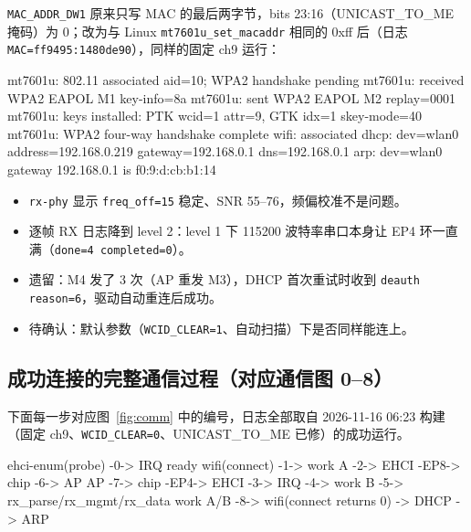 \documentclass[UTF8,zihao=-4,fontset=none]{ctexart}
\newcommand{\fn}[1]{\texttt{#1}}
\begin{document}
\fn{MAC\_ADDR\_DW1} 原来只写 MAC 的最后两字节，bits 23:16（UNICAST\_TO\_ME 掩码）为 0；改为与 Linux
\fn{mt7601u\_set\_macaddr} 相同的 0xff 后（日志 \fn{MAC=ff9495:1480de90}），同样的固定 ch9 运行：

\begin{logv}
mt7601u: 802.11 associated aid=10; WPA2 handshake pending
mt7601u: received WPA2 EAPOL M1 key-info=8a
mt7601u: sent WPA2 EAPOL M2 replay=0001
mt7601u: keys installed: PTK wcid=1 attr=9, GTK idx=1 skey-mode=40
mt7601u: WPA2 four-way handshake complete
wifi: associated
dhcp: dev=wlan0 address=192.168.0.219 gateway=192.168.0.1 dns=192.168.0.1
arp: dev=wlan0 gateway 192.168.0.1 is f0:9:d:cb:b1:14
\end{logv}

\begin{itemize}[leftmargin=2em]
\item \fn{rx-phy} 显示 \fn{freq\_off=15} 稳定、SNR 55--76，频偏校准不是问题。
\item 逐帧 RX 日志降到 level 2：level 1 下 115200 波特率串口本身让 EP4 环一直满（\fn{done=4 completed=0}）。
\item 遗留：M4 发了 3 次（AP 重发 M3），DHCP 首次重试时收到 \fn{deauth reason=6}，驱动自动重连后成功。
\item 待确认：默认参数（\fn{WCID\_CLEAR=1}、自动扫描）下是否同样能连上。
\end{itemize}


\subsection{成功连接的完整通信过程（对应通信图 0--8）}\label{sec:steps}

下面每一步对应图~\ref{fig:comm} 中的编号，日志全部取自 2026-11-16 06:23 构建（固定 ch9、\fn{WCID\_CLEAR=0}、UNICAST\_TO\_ME 已修）的成功运行。

\begin{code}
ehci-enum(probe) -0-> IRQ ready
wifi(connect) -1-> work A -2-> EHCI -EP8-> chip -6-> AP
AP -7-> chip -EP4-> EHCI -3-> IRQ -4-> work B -5-> rx_parse/rx_mgmt/rx_data
work A/B -8-> wifi(connect returns 0) -> DHCP -> ARP
\end{code}
\end{document}
